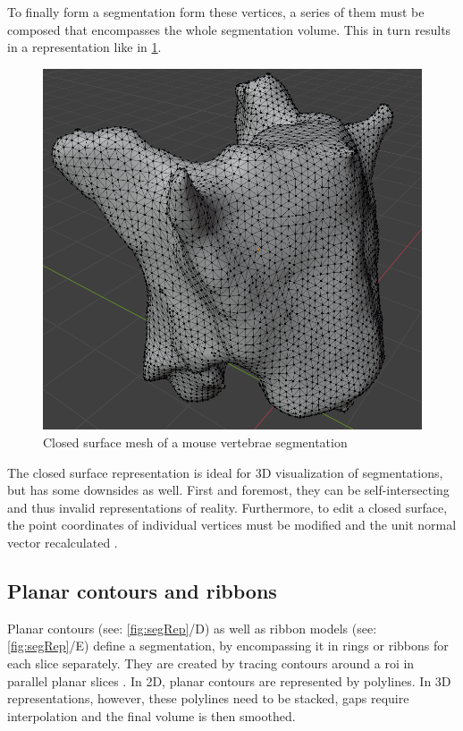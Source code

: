 \noindent
To finally form a segmentation form these vertices, a series of them must be composed that encompasses the whole segmentation volume.
This in turn results in a representation like in \cref{fig:spineMesh}.
\begin{figure}[h]
	\centerline{
		\includegraphics[scale=0.4]{images/spineMesh.png}}
	\caption{Closed surface mesh of a mouse vertebrae segmentation}\label{fig:spineMesh}
\end{figure}

\noindent
The closed surface representation is ideal for 3D visualization of segmentations, but has some downsides as well.
First and foremost, they can be self-intersecting and thus invalid representations of reality.
Furthermore, to edit a closed surface, the point coordinates of individual vertices must be modified
and the unit normal vector recalculated \cite{pinterPolymorphSegmentationRepresentation2019}.


\subsection{Planar contours and ribbons}\label{s:b-planar-contours}
Planar contours (see: \cref{fig:segRep}/D) as well as ribbon models (see: \cref{fig:segRep}/E) define a segmentation,
by encompassing it in rings or ribbons for each slice separately.
They are created by tracing contours around a \acrfull{roi} in parallel planar slices \cite{pinterPolymorphSegmentationRepresentation2019,weinsteinScanlineSurfacingBuilding2000}.
In 2D, planar contours are represented by polylines.
In 3D representations, however, these polylines need to be stacked, gaps require interpolation and the final volume is then smoothed.

